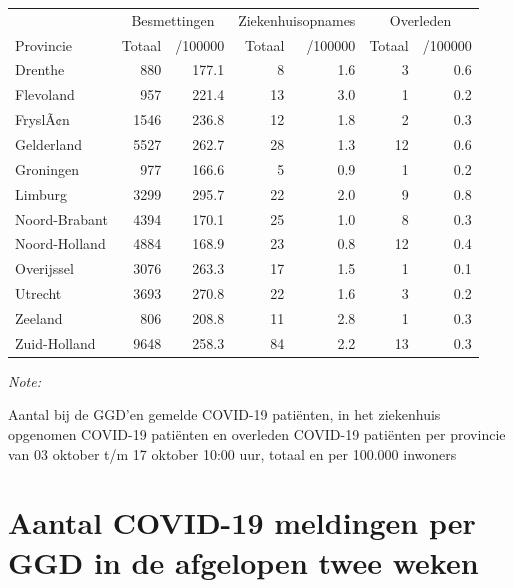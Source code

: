 \documentclass[
  english,
  man,floatsintext]{apa6}
\begin{document}
\begin{table}
\centering
\begin{threeparttable}
\begin{tabular}{lrrrrrr}
\toprule
\multicolumn{1}{c}{ } & \multicolumn{2}{c}{Besmettingen} & \multicolumn{2}{c}{Ziekenhuisopnames} & \multicolumn{2}{c}{Overleden} \\
\cmidrule(l{3pt}r{3pt}){2-3} \cmidrule(l{3pt}r{3pt}){4-5} \cmidrule(l{3pt}r{3pt}){6-7}
Provincie & Totaal & /100000 & Totaal & /100000 & Totaal & /100000\\
\midrule
Drenthe & 880 & 177.1 & 8 & 1.6 & 3 & 0.6\\
Flevoland & 957 & 221.4 & 13 & 3.0 & 1 & 0.2\\
FryslÃ¢n & 1546 & 236.8 & 12 & 1.8 & 2 & 0.3\\
Gelderland & 5527 & 262.7 & 28 & 1.3 & 12 & 0.6\\
Groningen & 977 & 166.6 & 5 & 0.9 & 1 & 0.2\\
Limburg & 3299 & 295.7 & 22 & 2.0 & 9 & 0.8\\
Noord-Brabant & 4394 & 170.1 & 25 & 1.0 & 8 & 0.3\\
Noord-Holland & 4884 & 168.9 & 23 & 0.8 & 12 & 0.4\\
Overijssel & 3076 & 263.3 & 17 & 1.5 & 1 & 0.1\\
Utrecht & 3693 & 270.8 & 22 & 1.6 & 3 & 0.2\\
Zeeland & 806 & 208.8 & 11 & 2.8 & 1 & 0.3\\
Zuid-Holland & 9648 & 258.3 & 84 & 2.2 & 13 & 0.3\\
\bottomrule
\end{tabular}
\begin{tablenotes}
\item \textit{Note: } 
\item Aantal bij de GGD’en gemelde COVID-19 patiënten, in het ziekenhuis opgenomen COVID-19 patiënten en overleden COVID-19 patiënten per provincie van 03 oktober t/m 17 oktober 10:00 uur, totaal en per 100.000 inwoners
\end{tablenotes}
\end{threeparttable}
\end{table}

\newpage

\hypertarget{aantal-covid-19-meldingen-per-ggd-in-de-afgelopen-twee-weken}{%
\section{Aantal COVID-19 meldingen per GGD in de afgelopen twee weken}\label{aantal-covid-19-meldingen-per-ggd-in-de-afgelopen-twee-weken}}
\end{document}
